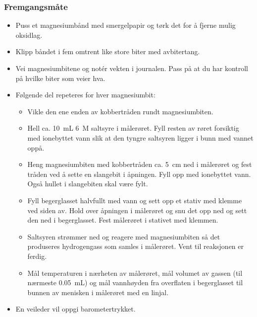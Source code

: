 	\subsubsection{Fremgangsmåte}
	\begin{itemize}
		\item Puss et magnesiumbånd med smergelpapir og tørk det for å fjerne mulig oksidlag.
		
		\item Klipp båndet i fem omtrent like store biter med avbitertang.
		
		\item Vei magnesiumbitene og notér vekten i journalen. Pass på at du har kontroll på hvilke biter som veier hva.
		
		\item Følgende del repeteres for hver magnesiumbit:
		\begin{itemize}
			\item Vikle den ene enden av kobbertråden rundt magnesiumbiten. 
			
			\item Hell ca. \SI{10}{mL} \SI{6}{M} saltsyre i målerøret. Fyll resten av røret forsiktig med ionebyttet vann slik at den tyngre saltsyren ligger i bunn med vannet oppå.
			
			\item Heng magnesiumbiten med kobbertråden ca. \SI{5}{cm} ned i målerøret og fest tråden ved å sette en slangebit i åpningen. Fyll opp med ionebyttet vann. Også hullet i slangebiten skal være fylt.
			
			\item Fyll begerglasset halvfullt med vann og sett opp et stativ med klemme ved siden av. Hold over åpningen i målerøret og snu det opp ned og sett den ned i begerglasset. Fest målerøret i stativet med klemmen.
			
			\item Saltsyren strømmer ned og reagere med magnesiumbiten så det produseres hydrogengass som samles i målerøret. Vent til reaksjonen er ferdig.
			
			\item Mål temperaturen i nærheten av målerøret, mål volumet av gassen (til nærmeste \SI{0.05}{mL}) og mål vannhøyden fra overflaten i begerglasset til bunnen av menisken i målerøret med en linjal.
		\end{itemize}
		
		\item En veileder vil oppgi barometertrykket.
		
	\end{itemize}	
	
